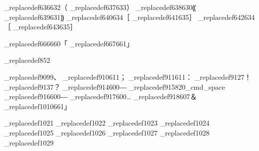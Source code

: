 \brl@mecab_replacedef{636}{632}{（}%
\brl@mecab_replacedef{637}{633}{）}%
\brl@mecab_replacedef{638}{630}{⸨}%
\brl@mecab_replacedef{639}{631}{⸩}%
\brl@mecab_replacedef{640}{634}{［}%
\brl@mecab_replacedef{641}{635}{］}%
\brl@mecab_replacedef{642}{634}{［}%
\brl@mecab_replacedef{643}{635}{］}%

\brl@mecab_replacedef{666}{660}{「}%
\brl@mecab_replacedef{667}{661}{」}%

\brl@mecab_replacedef{852}{\brl@mecab@idskip}{}%

\brl@mecab_replacedef{909}{9}{、}%
\brl@mecab_replacedef{910}{611}{；}%
\brl@mecab_replacedef{911}{611}{：}%
\brl@mecab_replacedef{912}{7}{！}%
\brl@mecab_replacedef{913}{7}{？}%
\brl@mecab_replacedef{914}{600}{―}%
\brl@mecab_replacedef{915}{820}{\brl@text_cmd_space}%
\brl@mecab_replacedef{916}{600}{―}%
\brl@mecab_replacedef{917}{600}{…}%
\brl@mecab_replacedef{918}{607}{＆}%
\brl@mecab_replacedef{1010}{661}{」}%

\brl@mecab_replacedef{1021}{\brl@mecab@idskip}{}%
\brl@mecab_replacedef{1022}{\brl@mecab@idskip}{}%
\brl@mecab_replacedef{1023}{\brl@mecab@idskip}{}%
\brl@mecab_replacedef{1024}{\brl@mecab@idskip}{}%
\brl@mecab_replacedef{1025}{\brl@mecab@idskip}{}%
\brl@mecab_replacedef{1026}{\brl@mecab@idskip}{}%
\brl@mecab_replacedef{1027}{\brl@mecab@idskip}{}%
\brl@mecab_replacedef{1028}{\brl@mecab@idskip}{}%
\brl@mecab_replacedef{1029}{\brl@mecab@idskip}{}%


%



